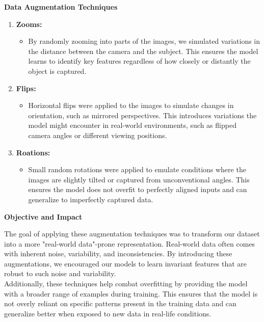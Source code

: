 \documentclass{modeleRapport}
\begin{document}
\textbf{Data Augmentation Techniques}\\
\begin{enumerate}
    \item \textbf{Zooms:} 
    \begin{itemize}
        \item By randomly zooming into parts of the images, we simulated variations in the distance between the camera 
        and the subject. This ensures the model learns to identify key features regardless of how closely or 
        distantly the object is captured.
    \end{itemize}

    \item \textbf{Flips:}
    \begin{itemize}
        \item Horizontal flips were applied to the images to simulate changes in orientation, such as mirrored perspectives. 
        This introduces variations the model might encounter in real-world environments, such as flipped camera angles or 
        different viewing positions.
    \end{itemize}

    \item \textbf{Roations:}
    \begin{itemize}
        \item Small random rotations were applied to emulate conditions where the images are slightly tilted or 
        captured from unconventional angles. This ensures the model does not overfit to perfectly aligned inputs 
        and can generalize to imperfectly captured data.\\
    \end{itemize}
\end{enumerate}

\textbf{Objective and Impact}

The goal of applying these augmentation techniques was to transform our dataset into a more "real-world data"-prone 
representation. Real-world data often comes with inherent noise, variability, and inconsistencies. By introducing these 
augmentations, we encouraged our models to learn invariant features that are robust to such noise and variability.\\

Additionally, these techniques help combat overfitting by providing the model with a broader range of examples during training. 
This ensures that the model is not overly reliant on specific patterns present in the training data and can generalize better 
when exposed to new data in real-life conditions.


\insererbiblio
\end{document}
